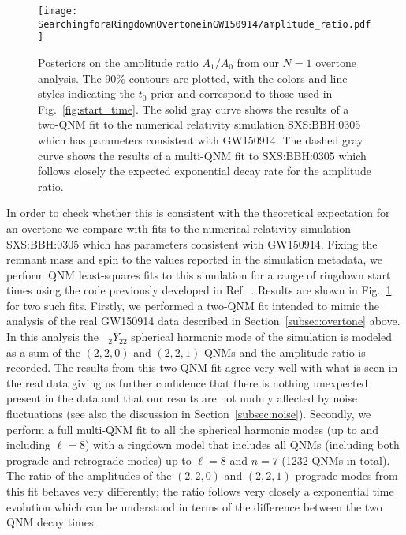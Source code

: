 \begin{figure}[t]
    \centering
    \texttt{[image: SearchingforaRingdownOvertoneinGW150914/amplitude\_ratio.pdf]}
    \caption[Posteriors on the amplitude ratio $A_1/A_0$ from the GW150914 overtone analysis]{ 
    Posteriors on the amplitude ratio $A_1/A_0$ from our $N=1$ overtone analysis. 
    The 90\% contours are plotted, with the colors and line styles indicating the $t_0$ prior and correspond to those used in Fig.~\ref{fig:start_time}.
    The solid gray curve shows the results of a two-QNM fit to the numerical relativity simulation SXS:BBH:0305 which has parameters consistent with GW150914.
    The dashed gray curve shows the results of a multi-QNM fit to SXS:BBH:0305 which follows closely the expected exponential decay rate for the amplitude ratio.
    }
    \label{fig:amp_ratio}
\end{figure}

In order to check whether this is consistent with the theoretical expectation for an overtone we compare with fits to the numerical relativity simulation SXS:BBH:0305 \cite{Lovelace:2016uwp, sxs_catalog} which has parameters consistent with GW150914.
Fixing the remnant mass and spin to the values reported in the simulation metadata, we perform QNM least-squares fits to this simulation for a range of ringdown start times using the code previously developed in Ref.~\cite{Finch:2021iip}.
Results are shown in Fig.~\ref{fig:amp_ratio} for two such fits. 
Firstly, we performed a two-QNM fit intended to mimic the analysis of the real GW150914 data described in Section~\ref{subsec:overtone} above. 
In this analysis the ${}_{-2}Y_{22}$ spherical harmonic mode of the simulation is modeled as a sum of the $(2,2,0)$ and $(2,2,1)$ QNMs and the amplitude ratio is recorded. 
The results from this two-QNM fit agree very well with what is seen in the real data giving us further confidence that there is nothing unexpected present in the data and that our results are not unduly affected by noise fluctuations (see also the discussion in Section~\ref{subsec:noise}). 
Secondly, we perform a full multi-QNM fit to all the spherical harmonic modes (up to and including $\ell = 8$) with a ringdown model that includes all QNMs (including both prograde and retrograde modes) up to $\ell = 8$ and $n = 7$ (1232 QNMs in total).
The ratio of the amplitudes of the $(2,2,0)$ and $(2,2,1)$ prograde modes from this fit behaves very differently; the ratio follows very closely a exponential time evolution which can be understood in terms of the difference between the two QNM decay times.

